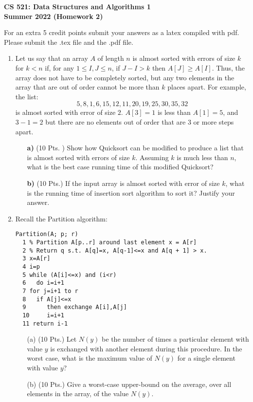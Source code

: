 \oddsidemargin 0.15in
\textwidth 6.25in
\topmargin-0.85in
\textheight 9.0in
\headsep 0.6in

\begin{center}
\begin{LARGE}{\bf CS 521: Data Structures and Algorithms 1\\Summer
      2022 (Homework 2)} \end{LARGE}
\end{center}

For an extra 5 credit points submit your answers as a latex compiled with pdf. Please submit the .tex file and the .pdf file.


\begin{enumerate}
\item Let us say that an array $A$ of length $n$ is almost sorted with
  errors of  size $k$  for $k  < n$ if,  for any  $1\le I,J\le  n$, if
  $J-I>k$ then  $A[J]\ge A[I]$.  Thus, the array  does not have  to be
  completely sorted, but any two elements in the array that are out of
  order cannot be more than $k$ places apart. For example, the list:
  $$5, 8, 1, 6, 15, 12, 11,  20, 19, 25, 30, 35, 32$$
  is almost sorted
  with error  of size $2$.  $A[3] =  1$ is less  than $A[1] =  5$, and
  $3-1=2$ but there are no elements  out of order that are $3$ or more
  steps apart.
\begin{itemize}
\item[{\bf a)}] (10 Pts. ) Show how  Quicksort can be  modified to
  produce  a list  that is  almost  sorted with  errors of  size $k$.  
  Assuming $k$ is much less than $n$, what is the best case running
  time of this modified Quicksort?

\item[{\bf  b)}] (10 Pts.)  If  the input  array is  almost sorted
  with error of size $k$, what is the running time of insertion sort
  algorithm to sort it?  Justify your answer.
\end{itemize}

\item Recall the Partition algorithm: 
\begin{verbatim}
Partition(A; p; r) 
  1 % Partition A[p..r] around last element x = A[r] 
  2 % Return q s.t. A[q]=x, A[q-1]<=x and A[q + 1] > x. 
  3 x=A[r] 
  4 i=p 
  5 while (A[i]<=x) and (i<r) 
  6   do i=i+1 
  7 for j=i+1 to r 
  8   if A[j]<=x 
  9      then exchange A[i],A[j] 
  10     i=i+1 
  11 return i-1 
\end{verbatim}
\begin{itemize}
\item[(a)] (10 Pts.)  Let $N(y)$ be the number of times a particular element with
  value $y$ is exchanged with another element during this procedure.
  In the worst case, what is the maximum value of $N(y)$ for a single
  element with value $y$?
\item[(b)] (10 Pts.) Give a worst-case upper-bound on the average, over all
  elements in the array, of the value $N(y)$.
\end{itemize}



\end{enumerate}
